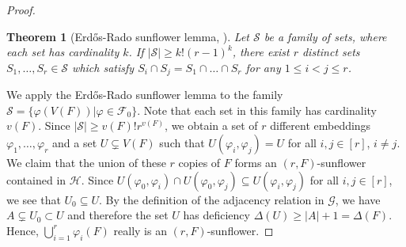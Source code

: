 \documentclass{daj}
\def\cF{\mathcal{F}}
\def\cG{\mathcal{G}}
\def\cH{\mathcal{H}}
\def\cS{\mathcal{S}}
\theoremstyle{plain}
\newtheorem*{theorem*}{Theorem}
\theoremstyle{remark}
\begin{document}
\begin{proof}
\begin{theorem*} [Erd\H{o}s-Rado sunflower lemma, \cite{ER60}]

Let $\cS$ be a family of sets, where each set has cardinality $k$. If $|\cS|\geq k!(r-1)^k$, there exist $r$ distinct sets $S_1, \dots, S_r\in \cS$ which satisfy $S_i\cap S_j=S_1\cap \dots\cap S_r$ for any $1\leq i< j\leq r$.
\end{theorem*}

\noindent
We apply the Erd\H{o}s-Rado sunflower lemma to the family $\cS=\{\varphi(V(F))|\varphi\in \cF_0\}$. Note that each set in this family has cardinality $v(F)$. Since $|\cS|\geq v(F)!r^{v(F)}$, we obtain a set of $r$ different embeddings $\varphi_1, \dots, \varphi_r$ and a set $U\subsetneq V(F)$ such that $U(\varphi_i, \varphi_{j})=U$ for all $i, j\in [r]$, $i\neq j$. We claim that the union of these $r$ copies of $F$ forms an $(r, F)$-sunflower contained in $\cH$. Since $U(\varphi_0, \varphi_i)\cap U(\varphi_0, \varphi_{j})\subseteq U(\varphi_i, \varphi_{j})$ for all $i, j\in [r]$, we see that $U_0\subseteq U$. By the definition of the adjacency relation in $\cG$, we have $A\subsetneq U_0\subset U$ and therefore the set $U$ has deficiency $\Delta(U)\geq |A|+1=\Delta(F)$. Hence,  $\bigcup_{i=1}^r \varphi_i(F)$ really is an $(r, F)$-sunflower.


\end{proof}
\end{document}
